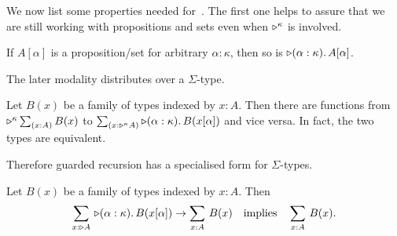 \documentclass[a4paper,UKenglish,numberwithinsect,cleveref,thm-restate,draft]{lipics-v2021}
\numberwithin{equation}{section}
\theoremstyle{definition}
\theoremstyle{plain}
\begin{document}
We now list some properties needed for~.
The first one helps to assure that we are still working with propositions and sets even when $\mathord{\triangleright}^\kappa$ is involved.
\begin{lemma}
  If $A[\alpha]$ is a proposition/set for arbitrary $\alpha : \kappa$, then so is $\mathord{\triangleright}(\alpha: \kappa).\, A [\alpha]$.
\end{lemma}
The later modality distributes over a $\Sigma$-type.
\begin{lemma}\label{lem:later-sum}
  Let $B(x)$ be a family of types indexed by $x : A$.
  Then there are functions from $\laterp^\kappa \sm{x : A} B(x)$ to $\sm{x : \laterp^\kappa A} \laterp (\alpha : \kappa).\, B(x [\alpha])$ and vice versa.
  In fact, the two types are equivalent.
\end{lemma}
Therefore guarded recursion has a specialised form for $\Sigma$-types.
\begin{corollary} \label{coro:lob-induction-sum}
  Let $B(x)$ be a family of types indexed by $x : A$.
  Then
  \[
    \sm{x : \laterp A} \laterp (\alpha : \kappa).\,B(x[\alpha]) \to \sm{x : A} B(x) \quad\text{implies}\quad \sm{x : A} B(x).
  \]
\end{corollary}
\end{document}
